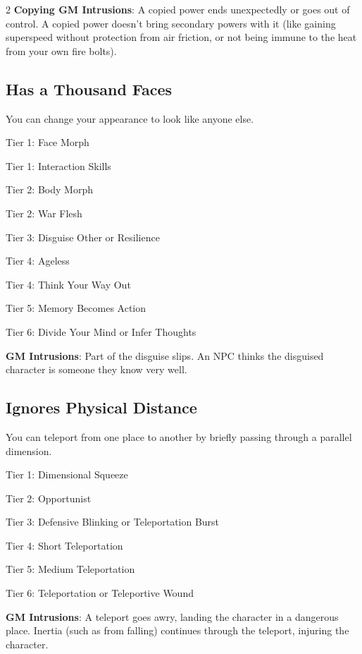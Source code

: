 \begin{multicols}{2}
\textbf{Copying GM Intrusions}: A copied power ends unexpectedly or goes out of control. A copied power doesn’t bring secondary powers with it (like gaining superspeed without protection from air friction, or not being immune to the heat from your own fire bolts).

\subsection{Has a Thousand Faces} 

You can change your appearance to look like anyone else.

Tier 1: Face Morph

Tier 1: Interaction Skills 

Tier 2: Body Morph

Tier 2: War Flesh

Tier 3: Disguise Other or Resilience

Tier 4: Ageless

Tier 4: Think Your Way Out 

Tier 5: Memory Becomes Action 

Tier 6: Divide Your Mind or Infer Thoughts 

\textbf{GM Intrusions}: Part of the disguise slips. An NPC thinks the disguised character is someone they know very well.

\subsection{Ignores Physical Distance} 

You can teleport from one place to another by briefly passing through a parallel dimension.

Tier 1: Dimensional Squeeze

Tier 2: Opportunist 

Tier 3: Defensive Blinking or Teleportation Burst

Tier 4: Short Teleportation

Tier 5: Medium Teleportation

Tier 6: Teleportation or Teleportive Wound

\textbf{GM Intrusions}: A teleport goes awry, landing the character in a dangerous place. Inertia (such as from falling) continues through the teleport, injuring the character.


\end{multicols}
